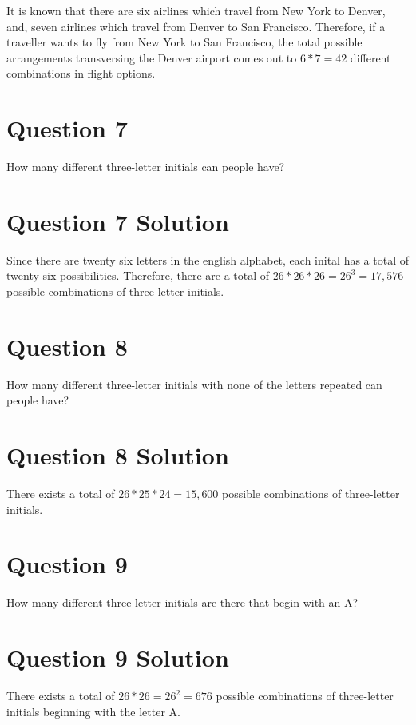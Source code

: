 \documentclass[11pt]{article}
\begin{document}
It is known that there are six airlines which travel from New York to Denver, and, seven airlines which travel from Denver to San Francisco. Therefore, if a traveller wants to fly from New York to San Francisco, the total possible arrangements transversing the Denver airport comes out to $6*7=42$ different combinations in flight options.

\section*{Question 7}

How many different three-letter initials can people have?

\section*{Question 7 Solution}

Since there are twenty six letters in the english alphabet, each inital has a total of twenty six possibilities. Therefore, there are a total of $26*26*26=26^3=17,576$ possible combinations of three-letter initials.

\section*{Question 8}

How many different three-letter initials with none of the letters repeated can people have?

\section*{Question 8 Solution}

There exists a total of $26*25*24=15,600$ possible combinations of three-letter initials.

\section*{Question 9}

How many different three-letter initials are there that begin with an A?

\section*{Question 9 Solution}

There exists a total of $26*26=26^2=676$ possible combinations of three-letter initials beginning with the letter A.
\end{document}
